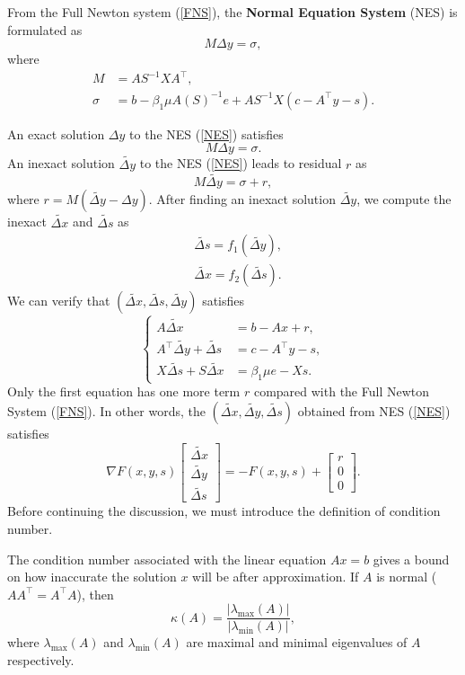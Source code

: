 \begin{definition}
From the Full Newton system (\ref{FNS}), the \textbf{Normal Equation System} (NES) is formulated as
\begin{equation}\label{NES}
    M \Delta y=\sigma,
\end{equation}
where
$$
\begin{aligned}
    M & = A S^{-1} X A^{\top} ,\\
    \sigma & =b-\beta_1 \mu A\left(S\right)^{-1} e+AS^{-1}X\left(c-A^{\top} y-s\right).
\end{aligned}
$$
\end{definition}
An exact solution $\Delta y$ to the NES (\ref{NES}) satisfies
$$
M \Delta y = \sigma.
$$
An inexact solution $\widetilde{\Delta y}$ to the NES (\ref{NES}) leads to residual $r$ as
$$
M \widetilde{\Delta y} = \sigma+r,
$$
where $r=M\left(\widetilde{\Delta y}-\Delta y\right)$. After finding an inexact solution $\widetilde{\Delta y}$, we compute the inexact $\widetilde{\Delta x}$ and $\widetilde{\Delta s}$ as
$$
\begin{aligned}
    & \widetilde{\Delta s} = f_1(\widetilde{\Delta y}), \\
    & \widetilde{\Delta x} = f_2(\widetilde{\Delta s}).
\end{aligned}
$$
We can verify that $\left(\widetilde{\Delta x}, \widetilde{\Delta s}, \widetilde{\Delta y}\right)$ satisfies
$$
\left\{
\begin{aligned}
    A \widetilde{\Delta x} & =b-A x +r, \\
    A^{\top} \widetilde{\Delta y}+\widetilde{\Delta s} & =c-A^{\top} y-s, \\
    X \widetilde{\Delta s}+S \widetilde{\Delta x} & =\beta_1 \mu e-X s .
\end{aligned}
\right.
$$
Only the first equation has one more term $r$ compared with the Full Newton System (\ref{FNS}). In other words, the $(\widetilde{\Delta x} , \widetilde{\Delta y} , \widetilde{\Delta s} )$ obtained from NES (\ref{NES}) satisfies
$$
\nabla F(x, y, s)\left[\begin{array}{l}
\widetilde{\Delta x}  \\
\widetilde{\Delta y}  \\
\widetilde{\Delta s} 
\end{array}\right]=-F(x, y, s)+\left[\begin{array}{l}
r \\
0 \\
0
\end{array}\right].
$$
Before continuing the discussion, we must introduce the definition of condition number.
\begin{definition}
The condition number associated with the linear equation $Ax = b$ gives a bound on how inaccurate the solution $x$ will be after approximation. If $A$ is normal ($AA^{\top}=A^{\top}A$), then
$$
\kappa(A)=\frac{\left|\lambda_{\max }(A)\right|}{\left|\lambda_{\min }(A)\right|},
$$
where $\lambda_{\max }(A)$ and $\lambda_{\min }(A)$ are maximal and minimal eigenvalues of $A$ respectively.
\end{definition}

